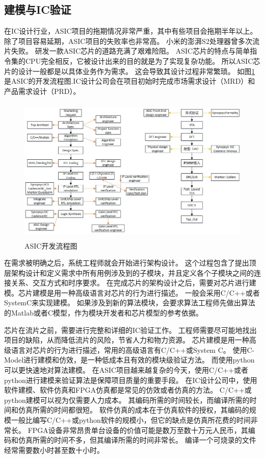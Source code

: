 \subsection{建模与IC验证}
在IC设计行业，ASIC项目的拖期情况非常严重，其中有些项目会拖期半年以上。
除了项目容易延期，ASIC项目的失败率也非常高。
小米的澎湃S2处理器曾多次流片失败。
研发一款ASIC芯片的道路充满了艰难险阻。
ASIC芯片的特点与简单指令集的CPU完全相反，它被设计出来的目的就是为了实现复杂功能。
所以ASIC芯片的设计一般都是以具体业务作为需求。
这会导致其设计过程非常繁琐。
如图\ref{fig:asic_flow}是ASIC的开发流程图.IC设计公司会在项目初始时完成市场需求设计（MRD）和产品需求设计（PRD）。
\begin{figure}[htbp]
    \centering
    \includegraphics[width=12cm,height=7cm]{figures/asic_flow.jpeg}
    \caption{ASIC开发流程图}
    \label{fig:asic_flow}
\end{figure}
在需求被明确之后，系统工程师就会开始进行架构设计。
这个过程包含了提出顶层架构设计和定义需求中所有用例涉及到的子模块，并且定义各个子模块之间的连接关系、交互方式和时序要求。
在完成芯片的架构设计之后，需要对芯片进行建模。芯片建模是用一种高级语言对芯片的行为进行描述。
一般会采用C/C++或者SystemC来实现建模。
如果涉及到新的算法模块，会要求算法工程师先做出算法的Matlab或者C模型，作为模块开发者和芯片模型的参考依据。   

芯片在流片之前，需要进行完整和详细的IC验证工作。
工程师需要尽可能地找出项目的缺陷，从而降低流片的风险，节省人力和物力资源。
芯片建模是用一种高级语言对芯片的行为进行描述，常用的高级语言有C/C++或System C。
使用C-Model进行建模和仿效，是一种低成本且有效的模块级验证方法。
而使用python可以更快速地对算法建模。
在ASIC项目越来越复杂的今天，使用C/C++或者python进行建模来验证算法是保障项目质量的重要手段。
在IC设计公司中，使用软件建模、软件仿真和FPGA仿真都是常见的仿效或者仿真的方法。
C/C++或python建模可以视为仅需要人力成本。
其编码所需的时间较长，而编译所需的时间和仿真所需的时间都很短。
软件仿真的成本在于仿真软件的授权，其编码的规模一般比编写C/C++或python软件的规模小，但它的缺点是仿真所花费的时间非常长。
FPGA设备非常昂贵单台设备的价值可能是数万至数十万元人民币，其编码和仿真所需的时间不多，但其编译所需的时间非常长。
编译一个可烧录的文件经常需要数小时甚至数十小时。

